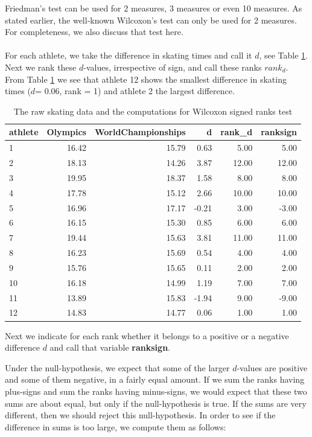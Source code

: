 \documentclass[]{book}\usepackage[]{graphicx}\usepackage[]{color}
\begin{document}
Friedman's test can be used for 2 measures, 3 measures or even 10 measures. As stated earlier, the well-known Wilcoxon's test can only be used for 2 measures. For completeness, we also discuss that test here.
\\
\\
For each athlete, we take the difference in skating times and call it $d$, see Table \ref{tab:nonparmixed_77}. Next we rank these $d$-values, irrespective of sign, and call these ranks $rank_d$. From Table \ref{tab:nonparmixed_77} we see that athlete 12 shows the smallest difference in skating times ($d$= 0.06, rank = 1) and athlete 2 the largest difference.

\begin{table}[ht]
\centering
\caption{The raw skating data and the computations for Wilcoxon signed ranks test} 
\label{tab:nonparmixed_77}
\begin{tabular}{lrrrrr}
  \hline
athlete & Olympics & WorldChampionships & d & rank\_d & ranksign \\ 
  \hline
1 & 16.42 & 15.79 & 0.63 & 5.00 & 5.00 \\ 
  2 & 18.13 & 14.26 & 3.87 & 12.00 & 12.00 \\ 
  3 & 19.95 & 18.37 & 1.58 & 8.00 & 8.00 \\ 
  4 & 17.78 & 15.12 & 2.66 & 10.00 & 10.00 \\ 
  5 & 16.96 & 17.17 & -0.21 & 3.00 & -3.00 \\ 
  6 & 16.15 & 15.30 & 0.85 & 6.00 & 6.00 \\ 
  7 & 19.44 & 15.63 & 3.81 & 11.00 & 11.00 \\ 
  8 & 16.23 & 15.69 & 0.54 & 4.00 & 4.00 \\ 
  9 & 15.76 & 15.65 & 0.11 & 2.00 & 2.00 \\ 
  10 & 16.18 & 14.99 & 1.19 & 7.00 & 7.00 \\ 
  11 & 13.89 & 15.83 & -1.94 & 9.00 & -9.00 \\ 
  12 & 14.83 & 14.77 & 0.06 & 1.00 & 1.00 \\ 
   \hline
\end{tabular}
\end{table}


Next we indicate for each rank whether it belongs to a positive or a negative difference $d$ and call that variable \textbf{ranksign}.

Under the null-hypothesis, we expect that some of the larger $d$-values are positive and some of them negative, in a fairly equal amount. If we sum the ranks having plus-signs and sum the ranks having minus-signs, we would expect that these two sums are about equal, but only if the null-hypothesis is true. If the sums are very different, then we should reject this null-hypothesis. In order to see if the difference in sums is too large, we compute them as follows:
\end{document}
